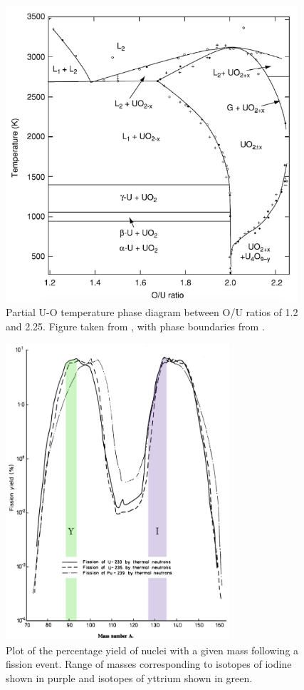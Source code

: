 \begin{figure}[htp]
\centering
\includegraphics[height=11cm]{images/UO_phase_diagram.png}
\caption{Partial U-O temperature phase diagram between O/U ratios of 1.2 and 2.25. Figure taken from \cite{katz2007chemistry}, with phase boundaries from \cite{rand1978thermodynamic, chevalier2002progress, gueneau2002thermodynamic}.}
\label{figure:U_O_phase_diagram}
\end{figure}


\begin{figure}[htp]
\centering
\includegraphics[height=11cm]{images/fissionyield.jpg}
\caption{Plot of the percentage yield of nuclei with a given mass following a fission event. Range of masses corresponding to isotopes of iodine shown in purple and isotopes of yttrium shown in green.}
\label{figure:fissionyield}
\end{figure}

